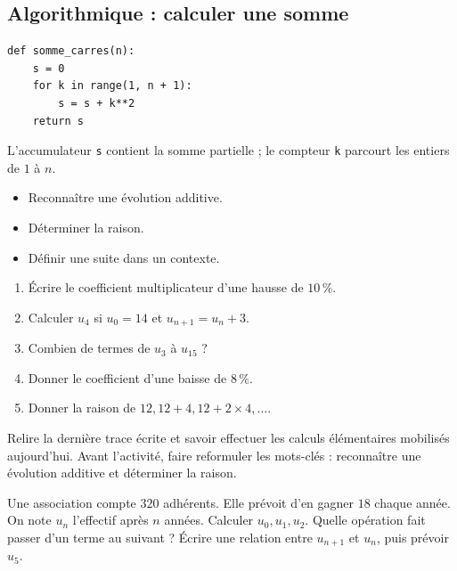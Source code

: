 \subsection{Algorithmique : calculer une somme}
\begin{lstlisting}[style=python]
def somme_carres(n):
    s = 0
    for k in range(1, n + 1):
        s = s + k**2
    return s
\end{lstlisting}
L'accumulateur \texttt{s} contient la somme partielle ; le compteur \texttt{k} parcourt les entiers de $1$ à $n$.

    \begin{objectifs}\begin{itemize}\item Reconnaître une évolution additive.\item Déterminer la raison.\item Définir une suite dans un contexte.\end{itemize}\end{objectifs}
    \begin{automatismes}\begin{enumerate}\item Écrire le coefficient multiplicateur d'une hausse de $10\,\%$. \item Calculer $u_4$ si $u_0=14$ et $u_{n+1}=u_n+3$. \item Combien de termes de $u_3$ à $u_{15}$ ? \item Donner le coefficient d'une baisse de $8\,\%$. \item Donner la raison de $12,12+4,12+2\times4,\ldots$. \end{enumerate}\end{automatismes}
    \begin{prerequis}Relire la dernière trace écrite et savoir effectuer les calculs élémentaires mobilisés aujourd'hui. Avant l'activité, faire reformuler les mots-clés : reconnaître une évolution additive et déterminer la raison.\end{prerequis}

    \begin{activite}
    Une association compte $320$ adhérents. Elle prévoit d'en gagner $18$ chaque année. On note $u_n$ l'effectif après $n$ années. Calculer $u_0,u_1,u_2$. Quelle opération fait passer d'un terme au suivant ? Écrire une relation entre $u_{n+1}$ et $u_n$, puis prévoir $u_5$.
    \begin{center}\end{center}
    \end{activite}


